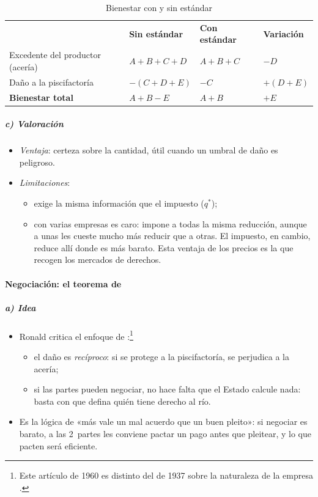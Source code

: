 \documentclass[11pt]{article}
\begin{document}
\begin{table}[H]
\centering
\caption{Bienestar con y sin estándar}\label{tab:estandar-bienestar}
\begin{tabular}{>{\centering\arraybackslash}m{4.4cm}|>{\centering\arraybackslash}m{2.7cm}|>{\centering\arraybackslash}m{2.7cm}|>{\centering\arraybackslash}m{2.7cm}}
\rowcolor{tceeazulpalido} & \textbf{Sin estándar} & \textbf{Con estándar} & \textbf{Variación} \\ \hhline{-|-|-|-|}
Excedente del productor (acería) & $A+B+C+D$ & $A+B+C$ & $-D$ \\ \hhline{-|-|-|-|}
Daño a la piscifactoría & $-(C+D+E)$ & $-C$ & $+(D+E)$ \\ \hhline{-|-|-|-|}
\cellcolor{tceesalvia}\textbf{Bienestar total} & \cellcolor{tceesalvia}$A+B-E$ & \cellcolor{tceesalvia}$A+B$ & \cellcolor{tceesalvia}$+E$ \\
\end{tabular}
\end{table}

\subparagraph{c) Valoración}
\begin{itemize}
\item \emph{Ventaja}: certeza sobre la cantidad, útil cuando un umbral de daño es peligroso.
\item \emph{Limitaciones}:
  \begin{itemize}
  \item exige la misma información que el impuesto ($q^*$);
  \item con varias empresas es caro: impone a todas la misma reducción, aunque a unas les cueste mucho más reducir que a otras. El impuesto, en cambio, reduce allí donde es más barato. Esta ventaja de los precios es la que recogen los mercados de derechos.
  \end{itemize}
\end{itemize}

\paragraph{Negociación: el teorema de }

\subparagraph{a) Idea}
\begin{itemize}
\item Ronald \textcite{Coase1960Problem} critica el enfoque de :\footnote{Este artículo de 1960 es distinto del de 1937 sobre la naturaleza de la empresa .}
  \begin{itemize}
  \item el daño es \emph{recíproco}: si se protege a la piscifactoría, se perjudica a la acería;
  \item si las partes pueden negociar, no hace falta que el Estado calcule nada: basta con que defina quién tiene derecho al río.
  \end{itemize}
\item Es la lógica de «más vale un mal acuerdo que un buen pleito»: si negociar es barato, a las 2~partes les conviene pactar un pago antes que pleitear, y lo que pacten será eficiente.
\end{itemize}
\end{document}
